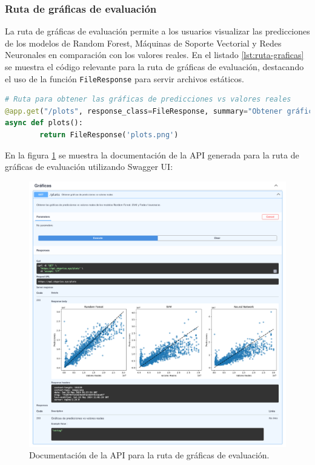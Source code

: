 \subsubsection{Ruta de gráficas de evaluación}
La ruta de gráficas de evaluación permite a los usuarios visualizar las predicciones
de los modelos de Random Forest, Máquinas de Soporte Vectorial y Redes Neuronales
en comparación con los valores reales. En el listado \ref{lst:ruta-graficas} se muestra
el código relevante para la ruta de gráficas de evaluación, destacando el uso de la
función \texttt{FileResponse} para servir archivos estáticos.

\begin{lstlisting}[language=python, caption={Ruta de gráficas de evaluación}, label={lst:ruta-graficas}]
# Ruta para obtener las gráficas de predicciones vs valores reales
@app.get("/plots", response_class=FileResponse, summary="Obtener gráficas de predicciones vs valores reales", description="Obtener las gráficas de predicciones vs valores reales de los modelos Random Forest, SVM y Redes Neuronales.", tags=["Gráficas"], response_description="Gráficas de predicciones vs valores reales")
async def plots():
        return FileResponse('plots.png')
\end{lstlisting}

En la figura \ref{fig:api-graficas} se muestra la documentación de la API generada
para la ruta de gráficas de evaluación utilizando Swagger UI:

\begin{figure}[H]
    \centering
    \includegraphics[width=1.0\textwidth]{imagenes/05-implementacion/servicio-web/api-plots.png}
    \caption{Documentación de la API para la ruta de gráficas de evaluación.}
    \label{fig:api-graficas}
\end{figure}

